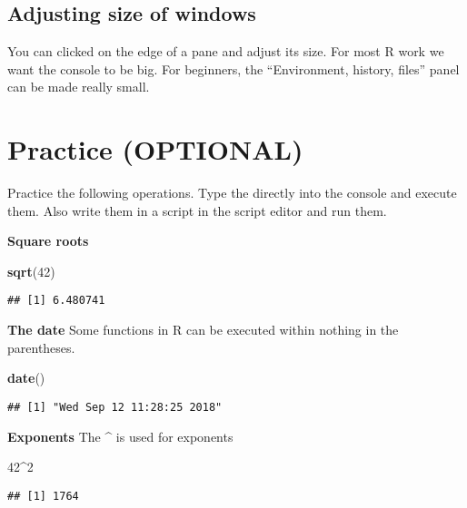 \documentclass[]{book}
\newenvironment{Shaded}{\begin{snugshade}}{\end{snugshade}}
\newcommand{\KeywordTok}[1]{\textcolor[rgb]{0.13,0.29,0.53}{\textbf{#1}}}
\newcommand{\DecValTok}[1]{\textcolor[rgb]{0.00,0.00,0.81}{#1}}
\newcommand{\OperatorTok}[1]{\textcolor[rgb]{0.81,0.36,0.00}{\textbf{#1}}}
\newcommand{\NormalTok}[1]{#1}
\theoremstyle{definition}
\theoremstyle{definition}
\theoremstyle{definition}
\theoremstyle{remark}
\begin{document}
\subsection{Adjusting size of windows}\label{adjusting-size-of-windows}

You can clicked on the edge of a pane and adjust its size. For most R
work we want the console to be big. For beginners, the ``Environment,
history, files'' panel can be made really small.

\section{Practice (OPTIONAL)}\label{practice-optional}

Practice the following operations. Type the directly into the console
and execute them. Also write them in a script in the script editor and
run them.

\textbf{Square roots}

\begin{Shaded}
\begin{Highlighting}[]
\KeywordTok{sqrt}\NormalTok{(}\DecValTok{42}\NormalTok{)}
\end{Highlighting}
\end{Shaded}

\begin{verbatim}
## [1] 6.480741
\end{verbatim}

\textbf{The date} Some functions in R can be executed within nothing in
the parentheses.

\begin{Shaded}
\begin{Highlighting}[]
\KeywordTok{date}\NormalTok{()}
\end{Highlighting}
\end{Shaded}

\begin{verbatim}
## [1] "Wed Sep 12 11:28:25 2018"
\end{verbatim}

\textbf{Exponents} The \textbf{\^{}} is used for exponents

\begin{Shaded}
\begin{Highlighting}[]
\DecValTok{42}\OperatorTok{^}\DecValTok{2}
\end{Highlighting}
\end{Shaded}

\begin{verbatim}
## [1] 1764
\end{verbatim}
\end{document}
